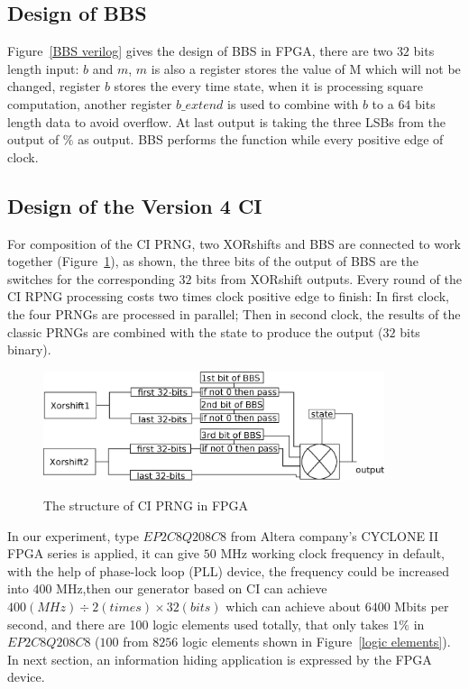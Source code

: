 \subsection{Design of BBS}
Figure~\ref{BBS verilog} gives the design of BBS in FPGA, there are two $32$ bits length input: 
$b$ and $m$, $m$ is also a register stores the value of M which will not be changed, register $b$ 
stores the every time state, when it is processing square computation, another register $b\_extend$ 
is used to combine with $b$ to a $64$ bits length data to avoid overflow. At last output is taking 
the three LSBs from the output of $\%$ as output. BBS performs the function while every positive 
edge of clock.

\subsection{Design of the Version 4 CI}
For composition of the CI PRNG, two XORshifts and BBS are connected to work together (Figure~\ref{CI verilog}), 
as shown, the three bits of the output of BBS are the switches for the corresponding $32$ bits from 
XORshift outputs. Every round of the CI RPNG processing costs two times clock positive edge to finish: In first clock, 
the four PRNGs are processed in parallel; Then in second clock, the results of the classic PRNGs are combined with 
the state to produce the output ($32$ bits binary).


\begin{figure}
 \begin{center}
 
  \includegraphics[width=10cm]{ci.eps}
  \label{CI verilog}
  \caption{The structure of CI PRNG in FPGA}
 \end{center}
\end{figure}

In our experiment, type $EP2C8Q208C8$ from Altera 
company's CYCLONE II FPGA series is applied, it can 
give $50$ MHz working clock frequency in default,
with the help of phase-lock loop (PLL) device, the frequency could be increased into 
$400$ MHz,then our generator based on CI can achieve $400 (MHz) \div 2 (times) \times 32 (bits)$
which can achieve about $6400$ Mbits per second, and there are 100 logic elements used totally, 
that only takes $1\%$ in $EP2C8Q208C8$ ($100$ from $8256$ logic elements shown in 
Figure~\ref{logic elements}). 
In next section, an information hiding 
application is expressed by the FPGA device.

